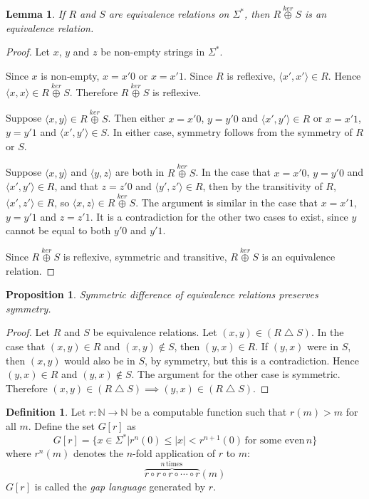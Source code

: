\documentclass[draft]{article}
\newtheorem{lemma}[lemma]{Lemma}
\newtheorem{proposition}[proposition]{Proposition}
\theoremstyle{definition} \newtheorem{openproblem}[openproblem]{Open problem}
\theoremstyle{definition} \newtheorem{definition}[definition]{Definition}
\theoremstyle{remark} \newtheorem{remark}{Remark}
\newcommand{\plain}[1]{\,\text{#1}\,} %
\newcommand{\kj}{\overset{ker}{\oplus}} %
\newcommand{\symdiff}{\bigtriangleup} %
\newcommand{\defn}[1]{\emph{#1}} %
\newcommand{\pair}[2]{\langle#1,#2\rangle} %
\begin{document}
\begin{lemma}\label{lem:join}
  If $R$ and $S$ are equivalence relations on $\Sigma^*$, then $R\kj S$ is an equivalence relation.
\end{lemma}
\begin{proof}
  Let $x$, $y$ and $z$ be non-empty strings in $\Sigma^*$.
  
  Since $x$ is non-empty, $x=x'0$ or $x=x'1$.
  Since $R$ is reflexive, $\pair{x'}{x'}\in R$.
  Hence $\pair{x}{x}\in R\kj S$.
  Therefore $R\kj S$ is reflexive.
  
  Suppose $\pair{x}{y}\in R\kj S$.
  Then either $x=x'0$, $y=y'0$ and $\pair{x'}{y'}\in R$ or $x=x'1$, $y=y'1$ and $\pair{x'}{y'}\in S$.
  In either case, symmetry follows from the symmetry of $R$ or $S$.

  Suppose $\pair{x}{y}$ and $\pair{y}{z}$ are both in $R\kj S$.
  In the case that $x=x'0$, $y=y'0$ and $\pair{x'}{y'}\in R$, and that $z=z'0$ and $\pair{y'}{z'}\in R$, then by the transitivity of $R$, $\pair{x'}{z'}\in R$, so $\pair{x}{z}\in R\kj S$.
  The argument is similar in the case that $x=x'1$, $y=y'1$ and $z=z'1$.
  It is a contradiction for the other two cases to exist, since $y$ cannot be equal to both $y'0$ and $y'1$.

  Since $R\kj S$ is reflexive, symmetric and transitive, $R\kj S$ is an equivalence relation.
\end{proof}

\begin{proposition}\label{prop:symdiff}
  Symmetric difference of equivalence relations preserves symmetry.
\end{proposition}
\begin{proof}
  Let $R$ and $S$ be equivalence relations.
  Let $(x,y)\in(R\symdiff S)$.
  In the case that $(x,y)\in R$ and $(x,y)\notin S$, then $(y,x)\in R$.
  If $(y,x)$ were in $S$, then $(x,y)$ would also be in $S$, by symmetry, but this is a contradiction.
  Hence $(y,x)\in R$ and $(y,x)\notin S$.
  The argument for the other case is symmetric.
  Therefore $(x,y)\in(R\symdiff S)\implies (y,x)\in(R\symdiff S)$.
\end{proof}

\begin{definition}
  Let $r\colon\mathbb{N}\to\mathbb{N}$ be a computable function such that $r(m)>m$ for all $m$.
  Define the set $G[r]$ as
  \begin{displaymath}
    G[r]=\{x\in\Sigma^*|r^n(0)\leq|x|<r^{n+1}(0) \plain{for some even} n\}
  \end{displaymath}
  where $r^n(m)$ denotes the $n$-fold application of $r$ to $m$:
  \begin{displaymath}
    \overbrace{r\circ r\circ r\circ\cdots\circ r}^{n \plain{times}}(m)
  \end{displaymath}
  $G[r]$ is called the \defn{gap language} generated by $r$.
\end{definition}
\end{document}
